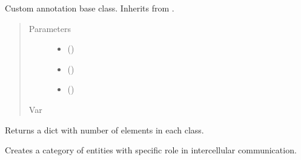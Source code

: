 \documentclass[letterpaper,10pt,english]{sphinxmanual}
\begin{document}
\begin{fulllineitems}
\label{\detokenize{reference:pypath.annot.CustomAnnotation}}
Custom annotation base class. Inherits from
.
\begin{quote}\begin{description}
\item[{Parameters}] \leavevmode\begin{itemize}
\item {} 
 () \textendash{} 

\item {} 
 () \textendash{} 

\item {} 
 () \textendash{} 

\end{itemize}

\item[{Var}] \leavevmode
\end{description}\end{quote}

\begin{fulllineitems}
\label{\detokenize{reference:pypath.annot.CustomAnnotation.counts}}
Returns a dict with number of elements in each class.

\end{fulllineitems}


\begin{fulllineitems}
\label{\detokenize{reference:pypath.annot.CustomAnnotation.create_class}}
Creates a category of entities with specific role in intercellular
communication.


\end{fulllineitems}
\end{fulllineitems}
\end{document}
